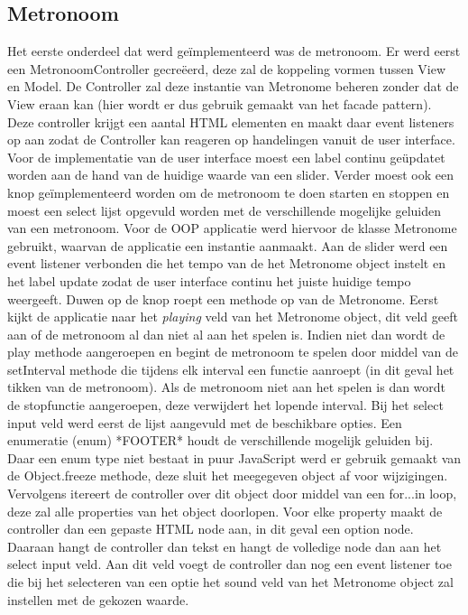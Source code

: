  \subsection{Metronoom}
 Het eerste onderdeel dat werd geïmplementeerd was de metronoom. Er werd eerst een MetronoomController gecreëerd, deze zal de koppeling vormen tussen View en Model. De Controller zal deze instantie van Metronome beheren zonder dat de View eraan kan (hier wordt er dus gebruik gemaakt van het facade pattern). Deze controller krijgt een aantal HTML elementen en maakt daar event listeners op aan zodat de Controller kan reageren op handelingen vanuit de user interface. Voor de implementatie van de user interface moest een label continu geüpdatet worden aan de hand van de huidige waarde van een slider. Verder moest ook een knop geïmplementeerd worden om de metronoom te doen starten en stoppen en moest een select lijst opgevuld worden met de verschillende mogelijke geluiden van een metronoom. Voor de OOP applicatie werd hiervoor de klasse Metronome gebruikt, waarvan de applicatie een instantie aanmaakt. Aan de slider werd een event listener verbonden die het tempo van de het Metronome object instelt en het label update zodat de user interface continu het juiste huidige tempo weergeeft. Duwen op de knop roept een methode op van de Metronome. Eerst kijkt de applicatie naar het \textit{playing} veld van het Metronome object, dit veld geeft aan of de metronoom al dan niet al aan het spelen is. Indien niet dan wordt de play methode aangeroepen en begint de metronoom te spelen door middel van de setInterval methode die tijdens elk interval een functie aanroept (in dit geval het tikken van de metronoom). Als de metronoom niet aan het spelen is dan wordt de stopfunctie aangeroepen, deze verwijdert het lopende interval. Bij het select input veld werd eerst de lijst aangevuld met de beschikbare opties. Een enumeratie (enum) *FOOTER* houdt de verschillende mogelijk geluiden bij. Daar een enum type niet bestaat in puur JavaScript werd er gebruik gemaakt van de Object.freeze methode, deze sluit het meegegeven object af voor wijzigingen. Vervolgens itereert de controller over dit object door middel van een for...in loop, deze zal alle properties van het object doorlopen. Voor elke property maakt de controller dan een gepaste HTML node aan, in dit geval een option node. Daaraan hangt de controller dan tekst en hangt de volledige node dan aan het select input veld. Aan dit veld voegt de controller dan nog een event listener toe die bij het selecteren van een optie het sound veld van het Metronome object zal instellen met de gekozen waarde.
